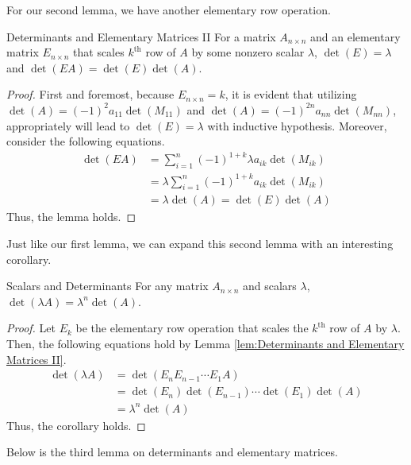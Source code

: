 \documentclass[../../../main.tex]{subfiles}
\begin{document}
For our second lemma, we have another elementary row operation.

\begin{lemma}{}{Determinants and Elementary Matrices II}
For a matrix $A_{n \times n}$ and an elementary matrix
$E_{n \times n}$ that scales $k^\text{th}$ row of $A$ by some nonzero
scalar $\lambda$, $\det(E) = \lambda$ and $\det(EA) = \det(E)
\det(A)$.
\end{lemma}
\begin{proof}
First and foremost, because $E_{n \times n} = k$, it is evident
that utilizing $\det(A) = (-1)^2 a_{11} \det(M_{11})$ and $\det(A) =
(-1)^{2n} a_{nn} \det(M_{nn})$, appropriately will lead to $\det(E) =
\lambda$ with inductive hypothesis. Moreover, consider the following
equations.
\begin{align*}
    \det(EA)
    &= \sum_{i=1}^n (-1)^{1+k} \lambda a_{ik} \det(M_{ik}) \\
    &= \lambda \sum_{i=1}^n (-1)^{1+k} a_{ik} \det(M_{ik}) \\
    &= \lambda \det(A) = \det(E) \det(A)
\end{align*}
Thus, the lemma holds.
\end{proof}

Just like our first lemma, we can expand this second lemma with
an interesting corollary.

\begin{corollary}{}{Scalars and Determinants}
For any matrix $A_{n \times n}$ and scalars $\lambda$,
$\det(\lambda A) = \lambda^n \det(A)$.
\end{corollary}
\begin{proof}
Let $E_k$ be the elementary row operation that scales the
$k^\text{th}$ row of $A$ by $\lambda$. Then, the following equations
hold by Lemma \ref{lem:Determinants and Elementary Matrices II}.
\begin{align*}
    \det(\lambda A)
    &= \det( E_n E_{n-1} \cdots E_1 A) \\
    &= \det(E_n) \det(E_{n-1}) \cdots \det(E_1) \det(A) \\
    &= \lambda^n \det(A)
\end{align*}
Thus, the corollary holds.
\end{proof}

Below is the third lemma on determinants and elementary matrices.
\end{document}
